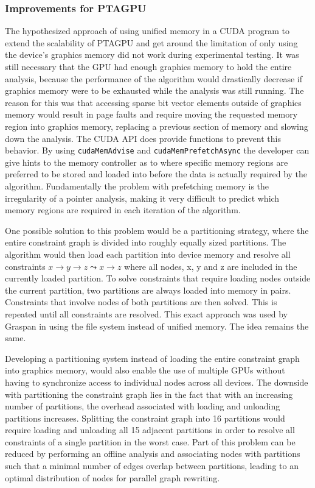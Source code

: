 \subsubsection{Improvements for PTAGPU}
The hypothesized approach of using unified memory in a CUDA program to extend the scalability of PTAGPU and get around the limitation of only using the device's graphics memory did not work during experimental testing.
It was still necessary that the GPU had enough graphics memory to hold the entire analysis, because the performance of the algorithm would drastically decrease if graphics memory were to be exhausted while the analysis was still running. The reason for this was that accessing sparse bit vector elements outside of graphics memory would result in page faults and require moving the requested memory region into graphics memory, replacing a previous section of memory and slowing down the analysis.
The CUDA API does provide functions to prevent this behavior. By using \verb|cudaMemAdvise| and \verb|cudaMemPrefetchAsync| the developer can give hints to the memory controller as to where specific memory regions are preferred to be stored and loaded into before the data is actually required by the algorithm.
Fundamentally the problem with prefetching memory is the irregularity of a pointer analysis, making it very difficult to predict which memory regions are required in each iteration of the algorithm.

One possible solution to this problem would be a partitioning strategy, where the entire constraint graph is divided into roughly equally sized partitions.
The algorithm would then load each partition into device memory and resolve all constraints  $x \rightarrow y \rightarrow z \mathrel{\leadsto} x \rightarrow z$ where all nodes, x, y and z are included in the currently loaded partition.
To solve constraints that require loading nodes outside the current partition, two partitions are always loaded into memory in pairs. Constraints that involve nodes of both partitions are then solved. This is repeated until all constraints are resolved.
This exact approach was used by Graspan in \cite{zuo2021systemizing} using the file system instead of unified memory. The idea remains the same.

Developing a partitioning system instead of loading the entire constraint graph into graphics memory, would also enable the use of multiple GPUs without having to synchronize access to individual nodes across all devices.
The downside with partitioning the constraint graph lies in the fact that with an increasing number of partitions, the overhead associated with loading and unloading partitions increases.
Splitting the constraint graph into 16 partitions would require loading and unloading all 15 adjacent partitions in order to resolve all constraints of a single partition in the worst case.
Part of this problem can be reduced by performing an offline analysis and associating nodes with partitions such that a minimal number of edges overlap between partitions, leading to an optimal distribution of nodes for parallel graph rewriting.

